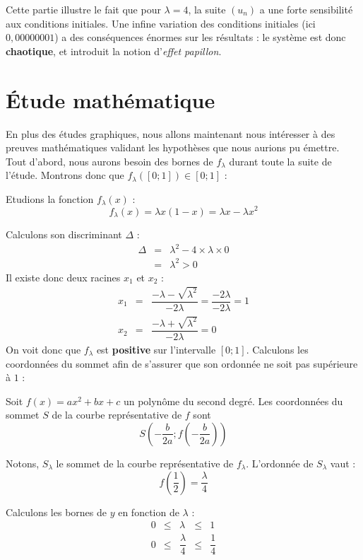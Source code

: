 Cette partie illustre le fait que pour $\lambda = 4$, la suite $(u_n)$ a une forte sensibilité aux conditions initiales. Une infine variation des conditions initiales (ici $0,00000001$) a des conséquences énormes sur les résultats : le système est donc \textbf{chaotique}, et introduit la notion d'\textit{effet papillon}.


\section{\'Etude mathématique}
En plus des études graphiques, nous allons maintenant nous intéresser à des preuves mathématiques validant les hypothèses que nous aurions pu émettre.
Tout d'abord, nous aurons besoin des bornes de $f_\lambda$ durant toute la suite de l'étude. Montrons donc que $f_\lambda([0;1])\in[0;1]$ :

Etudions la fonction $f_\lambda(x)$ :
\[
    f_\lambda(x)=\lambda x(1-x) = \lambda x - \lambda x^2
\]

Calculons son discriminant $\Delta$ :
\[
    \begin{array}{rcl}
        \Delta &=& \lambda^2-4\times\lambda\times 0 \\
        &=& \boxed{\lambda^2 > 0}
    \end{array}
\]
Il existe donc deux racines $x_1$ et $x_2$ :
\[
    \begin{array}{rcl}
        x_1 &=& \dfrac{- \lambda-\sqrt{\lambda^2}}{-2\lambda} = \dfrac{-2\lambda}{-2\lambda} = \boxed{1} \\
        x_2 &=& \dfrac{- \lambda+\sqrt{\lambda^2}}{-2\lambda} = \boxed{0}
    \end{array}
\]
On voit donc que $f_\lambda$ est \textbf{positive} sur l'intervalle $[0;1]$. Calculons les coordonnées du sommet afin de s'assurer que son ordonnée ne soit pas supérieure à $1$ :
\begin{axiome}
    Soit $f(x) = ax^2+bx+c$ un polynôme du second degré. Les coordonnées du sommet $S$ de la courbe représentative de $f$ sont
    \[
          S\left(-\frac{b}{2a};f\left(-\frac{b}{2a}\right)\right)
    \]
\end{axiome}

Notons, $S_\lambda$ le sommet de la courbe représentative de $f_\lambda$. L'ordonnée de $S_\lambda$ vaut :
\[
    f\left(\dfrac{1}{2}\right) = \dfrac{\lambda}{4}
\]

Calculons les bornes de $y$ en fonction de $\lambda$ :
\[
    \begin{array}{rcccl}
        0 &\leq& \lambda &\leq& 1 \\
        0 &\leq& \dfrac{\lambda}{4} &\leq& \dfrac{1}{4}
    \end{array}
\]

